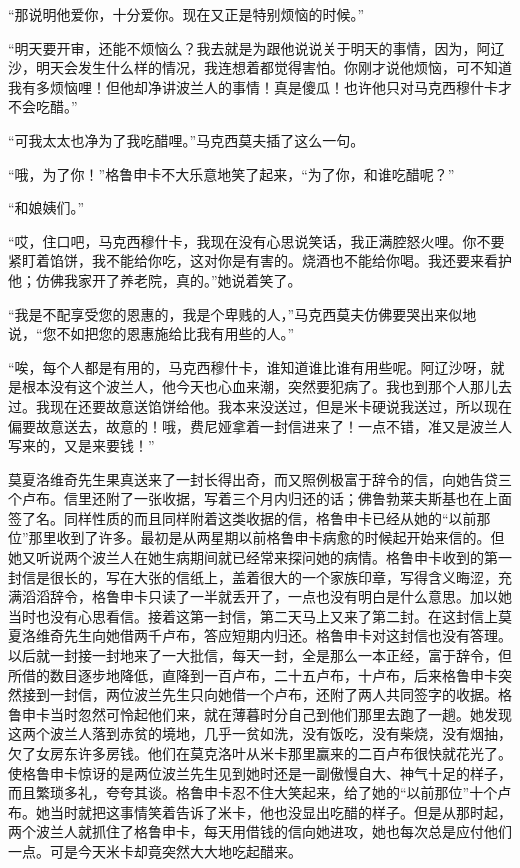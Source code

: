 \par “那说明他爱你，十分爱你。现在又正是特别烦恼的时候。”
\par “明天要开审，还能不烦恼么？我去就是为跟他说说关于明天的事情，因为，阿辽沙，明天会发生什么样的情况，我连想着都觉得害怕。你刚才说他烦恼，可不知道我有多烦恼哩！但他却净讲波兰人的事情！真是傻瓜！也许他只对马克西穆什卡才不会吃醋。”
\par “可我太太也净为了我吃醋哩。”马克西莫夫插了这么一句。
\par “哦，为了你！”格鲁申卡不大乐意地笑了起来，“为了你，和谁吃醋呢？”
\par “和娘姨们。”
\par “哎，住口吧，马克西穆什卡，我现在没有心思说笑话，我正满腔怒火哩。你不要紧盯着馅饼，我不能给你吃，这对你是有害的。烧酒也不能给你喝。我还要来看护他；仿佛我家开了养老院，真的。”她说着笑了。
\par “我是不配享受您的恩惠的，我是个卑贱的人，”马克西莫夫仿佛要哭出来似地说，“您不如把您的恩惠施给比我有用些的人。”
\par “唉，每个人都是有用的，马克西穆什卡，谁知道谁比谁有用些呢。阿辽沙呀，就是根本没有这个波兰人，他今天也心血来潮，突然要犯病了。我也到那个人那儿去过。我现在还要故意送馅饼给他。我本来没送过，但是米卡硬说我送过，所以现在偏要故意送去，故意的！哦，费尼娅拿着一封信进来了！一点不错，准又是波兰人写来的，又是来要钱！”
\par 莫夏洛维奇先生果真送来了一封长得出奇，而又照例极富于辞令的信，向她告贷三个卢布。信里还附了一张收据，写着三个月内归还的话；佛鲁勃莱夫斯基也在上面签了名。同样性质的而且同样附着这类收据的信，格鲁申卡已经从她的“以前那位”那里收到了许多。最初是从两星期以前格鲁申卡病愈的时候起开始来信的。但她又听说两个波兰人在她生病期间就已经常来探问她的病情。格鲁申卡收到的第一封信是很长的，写在大张的信纸上，盖着很大的一个家族印章，写得含义晦涩，充满滔滔辞令，格鲁申卡只读了一半就丢开了，一点也没有明白是什么意思。加以她当时也没有心思看信。接着这第一封信，第二天马上又来了第二封。在这封信上莫夏洛维奇先生向她借两千卢布，答应短期内归还。格鲁申卡对这封信也没有答理。以后就一封接一封地来了一大批信，每天一封，全是那么一本正经，富于辞令，但所借的数目逐步地降低，直降到一百卢布，二十五卢布，十卢布，后来格鲁申卡突然接到一封信，两位波兰先生只向她借一个卢布，还附了两人共同签字的收据。格鲁申卡当时忽然可怜起他们来，就在薄暮时分自己到他们那里去跑了一趟。她发现这两个波兰人落到赤贫的境地，几乎一贫如洗，没有饭吃，没有柴烧，没有烟抽，欠了女房东许多房钱。他们在莫克洛叶从米卡那里赢来的二百卢布很快就花光了。使格鲁申卡惊讶的是两位波兰先生见到她时还是一副傲慢自大、神气十足的样子，而且繁琐多礼，夸夸其谈。格鲁申卡忍不住大笑起来，给了她的“以前那位”十个卢布。她当时就把这事情笑着告诉了米卡，他也没显出吃醋的样子。但是从那时起，两个波兰人就抓住了格鲁申卡，每天用借钱的信向她进攻，她也每次总是应付他们一点。可是今天米卡却竟突然大大地吃起醋来。
